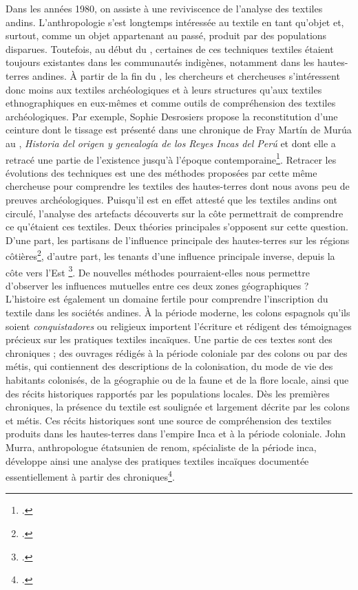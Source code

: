Dans les années 1980, on assiste à une reviviscence de l'analyse des textiles andins. L'anthropologie s'est longtemps intéressée au textile en tant qu'objet et, surtout, comme un objet appartenant au passé, produit par des populations disparues. Toutefois, au début du , certaines de ces techniques textiles étaient toujours existantes dans les communautés indigènes, notamment dans les hautes-terres andines. À partir de la fin du , les chercheurs et chercheuses s'intéressent donc moins aux textiles archéologiques et à leurs structures qu'aux textiles ethnographiques en eux-mêmes et comme outils de compréhension des textiles archéologiques. Par exemple, Sophie Desrosiers propose la reconstitution d'une ceinture dont le tissage est présenté dans une chronique de Fray Martín de Murúa  au , \textit{Historia del origen y genealogía de los Reyes Incas del Perú} et dont elle a retracé une partie de l'existence jusqu'à l'époque contemporaine\footcite{desrosiersExperienceTechnologieReconstruction1985}. Retracer les évolutions des techniques est une des méthodes proposées par cette même chercheuse pour comprendre les textiles des hautes-terres dont nous avons peu de preuves archéologiques. Puisqu'il est en effet attesté que les textiles andins ont circulé, l'analyse des artefacts découverts sur la côte permettrait de comprendre ce qu'étaient ces textiles. Deux théories principales s'opposent sur cette question. D'une part, les partisans de l'influence principale des hautes-terres sur les régions côtières\footcite{desrosiersHighlandComplementaryWarpWeaving2014}, d'autre part, les tenants d'une influence principale inverse, depuis la côte vers l'Est \footcite{arnoldCienciaTejerAndes2019}. De nouvelles méthodes pourraient-elles nous permettre d'observer les influences mutuelles entre ces deux zones géographiques ? \\

L'histoire est également un domaine fertile pour comprendre l'inscription du textile dans les sociétés andines. 
À la période moderne, les colons espagnols qu'ils soient \textit{conquistadores} ou religieux importent l'écriture et rédigent des témoignages précieux sur les pratiques textiles incaïques. Une partie de ces textes sont des chroniques ; des ouvrages rédigés à la période coloniale par des colons ou par des métis, qui contiennent des descriptions de la colonisation, du mode de vie des habitants colonisés, de la géographie ou de la faune et de la flore locale, ainsi que des récits historiques rapportés par les populations locales. Dès les premières chroniques, la présence du textile est soulignée et largement décrite par les colons et métis. Ces récits historiques sont une source de compréhension des textiles produits dans les hautes-terres dans l'empire Inca et à la période coloniale. John Murra, anthropologue étatsunien de renom, spécialiste de la période inca, développe ainsi une analyse des pratiques textiles incaïques documentée essentiellement à partir des chroniques\footcite{murraClothItsFunctions1962}.

